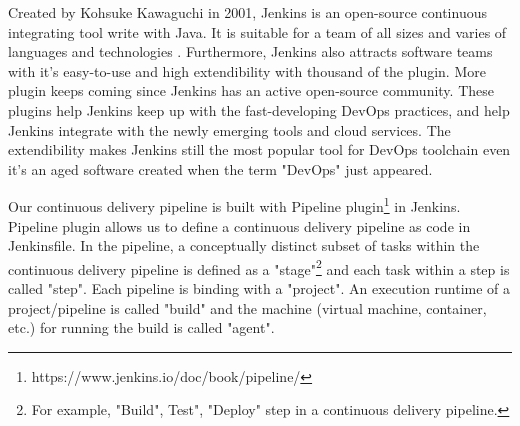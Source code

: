 \par
Created by Kohsuke Kawaguchi in 2001, Jenkins is an open-source continuous integrating tool write with Java.  It is suitable for a team of all sizes and varies of languages and technologies \cite{smart2011jenkins}. Furthermore, Jenkins also attracts software teams with it's easy-to-use and high extendibility \cite{smart2011jenkins} with thousand of the plugin. More plugin keeps coming since Jenkins has an active open-source community. These plugins help Jenkins keep up with the fast-developing DevOps practices, and help Jenkins integrate with the newly emerging tools and cloud services. The extendibility makes Jenkins still the most popular tool for DevOps toolchain even it's an aged software created when the term "DevOps" just appeared.
\par
Our continuous delivery pipeline is built with Pipeline plugin\footnote{https://www.jenkins.io/doc/book/pipeline/} in Jenkins. 
Pipeline plugin allows us to define a continuous delivery pipeline as code in Jenkinsfile.
In the pipeline, a conceptually distinct subset of tasks within the continuous delivery pipeline \cite{Pipeline85:online} is defined as a "stage"\footnote{For example, "Build", Test", "Deploy" step in a continuous delivery pipeline.} and each task within a step is called "step". Each pipeline is binding with a "project". An execution runtime of a project/pipeline is called "build" and the machine (virtual machine, container, etc.) for running the build is called "agent".

